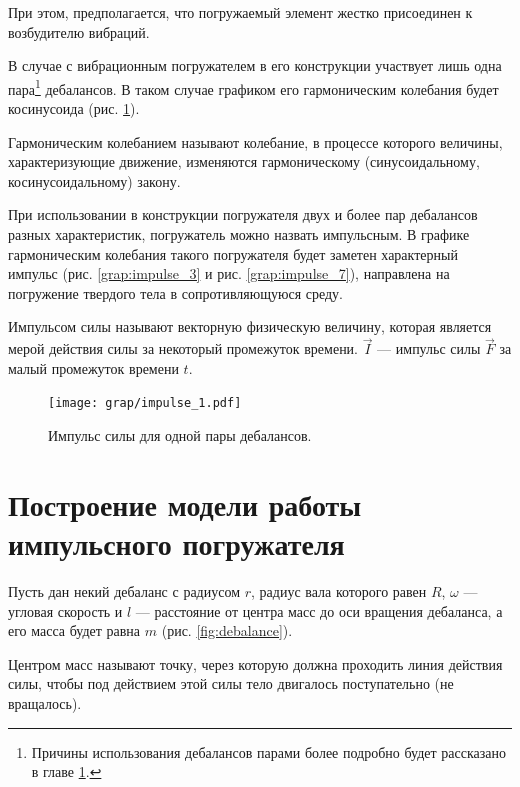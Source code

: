 При этом, предполагается, что погружаемый элемент жестко присоединен к возбудителю вибраций.

В случае с вибрационным погружателем в его конструкции участвует лишь одна
пара\footnote{Причины использования дебалансов парами более подробно будет рассказано в главе \ref{chapter:model}.} дебалансов.
В таком случае графиком его гармоническим колебания будет косинусоида (рис. \ref{grap:impulse_1}).

\begin{definition}
    Гармоническим колебанием называют колебание, в процессе которого величины, характеризующие движение,
    изменяются гармоническому (синусоидальному, косинусоидальному) закону.
\end{definition}

При использовании в конструкции погружателя двух и более пар дебалансов разных характеристик, погружатель можно назвать импульсным.
В графике гармоническим колебания такого погружателя будет заметен характерный импульс (рис. \ref{grap:impulse_3} и рис. \ref{grap:impulse_7}),
направлена на погружение твердого тела в сопротивляющуюся среду.

\begin{definition}
    Импульсом силы называют векторную физическую величину, которая является мерой действия силы за некоторый промежуток времени.
    $\vec{I}$ --- импульс силы $\vec{F}$ за малый промежуток времени $t$.
\end{definition}

\begin{figure}[h]
    \centering
    \texttt{[image: grap/impulse\_1.pdf]}
    \caption{Импульс силы для одной пары дебалансов.}
    \label{grap:impulse_1}
\end{figure}


\clearpage
\section{Построение модели работы импульсного погружателя}
\label{chapter:model}

Пусть дан некий дебаланс с радиусом $r$, радиус вала которого равен $R$,
$\omega$ --- угловая скорость и $l$ --- расстояние от центра масс до оси вращения дебаланса, а его масса будет равна $m$ (рис. \ref{fig:debalance}). 

\begin{definition}
    Центром масс называют точку, через которую должна проходить линия действия силы, чтобы под действием этой силы тело двигалось поступательно (не вращалось).
\end{definition}

